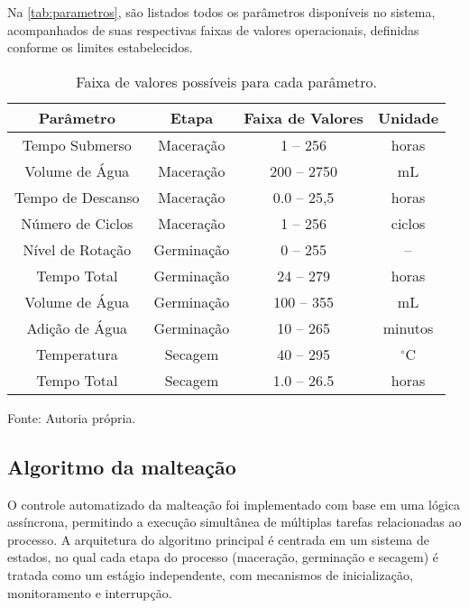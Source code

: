 Na \autoref{tab:parametros}, são listados todos os parâmetros disponíveis no sistema, acompanhados de suas respectivas faixas de valores operacionais, definidas conforme os limites estabelecidos.

\begin{table}[ht]
    \caption{Faixa de valores possíveis para cada parâmetro.}
    \label{tab:parametros}
    \centering
    \begin{tabular}{cccc}
        \hline
        \bfseries Parâmetro & \bfseries Etapa & \bfseries Faixa de Valores & \bfseries Unidade \\
        \hline
        Tempo Submerso & Maceração & 1 -- 256  & horas \\
        Volume de Água & Maceração & 200 -- 2750 & mL \\
        Tempo de Descanso & Maceração & 0.0 -- 25,5 & horas \\
        Número de Ciclos & Maceração & 1 -- 256 & ciclos \\
        Nível de Rotação & Germinação & 0 -- 255 & -- \\
        Tempo Total & Germinação & 24 -- 279 & horas \\
        Volume de Água & Germinação & 100 -- 355 & mL \\
        Adição de Água & Germinação & 10 -- 265 & minutos \\
        Temperatura & Secagem & 40 -- 295 & $^{\circ}$C \\
        Tempo Total & Secagem & 1.0 -- 26.5 & horas \\
        \hline
    \end{tabular}

    {\centering\footnotesize Fonte: Autoria própria.\par}
\end{table}



\subsection{Algoritmo da malteação}

O controle automatizado da malteação foi implementado com base em uma lógica assíncrona, permitindo a execução simultânea de múltiplas tarefas relacionadas ao processo. A arquitetura do algoritmo principal é centrada em um sistema de estados, no qual cada etapa do processo (maceração, germinação e secagem) é tratada como um estágio independente, com mecanismos de inicialização, monitoramento e interrupção.

